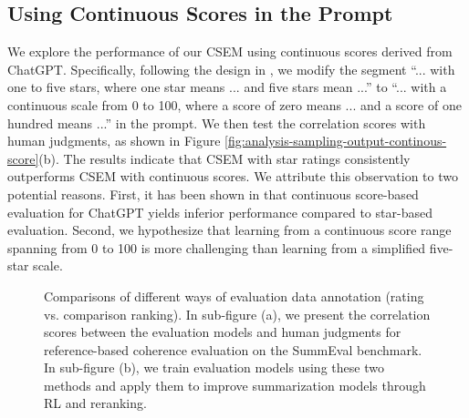 \documentclass[lettersize,journal]{IEEEtran}
\begin{document}
\subsection{Using Continuous Scores in the Prompt}
We explore the performance of our CSEM using continuous scores derived from ChatGPT. Specifically, following the design in \cite{kocmi2023large}, we modify the segment ``... with one to five stars, where one star means ... and five stars mean ...'' to ``... with a continuous scale from 0 to 100, where a score of zero means ... and a score of one hundred means ...'' in the prompt. We then test the correlation scores with human judgments, as shown in Figure \ref{fig:analysis-sampling-output-continous-score}(b). The results indicate that CSEM with star ratings consistently outperforms CSEM with continuous scores. We attribute this observation to two potential reasons. First, it has been shown in \cite{kocmi2023large} that continuous score-based evaluation for ChatGPT yields inferior performance compared to star-based evaluation. Second, we hypothesize that learning from a continuous score range spanning from 0 to 100 is more challenging than learning from a simplified five-star scale.

\begin{figure}[!t]
    \centering
    
    \vspace{-8mm}
    \caption{
    Comparisons of different ways of evaluation data annotation (rating vs. comparison ranking). In sub-figure (a), we present the correlation scores between the evaluation models and human judgments for reference-based coherence evaluation on the SummEval benchmark. In sub-figure (b), we train evaluation models using these two methods and apply them to improve summarization models through RL and reranking.
    }
    \vspace{-2mm}
    \label{fig:rating-vs-comparsion-ranking}
\end{figure}
\end{document}
